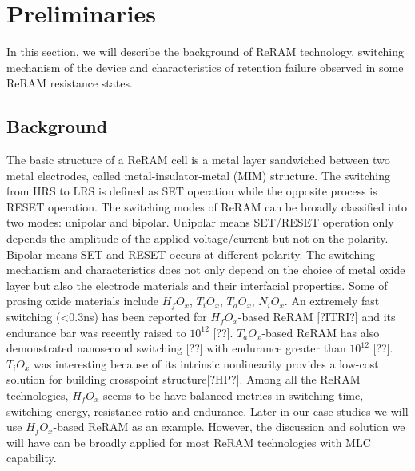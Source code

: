 \section{Preliminaries} \label{sec:preliminary}

In this section, we will describe the background of ReRAM technology, switching mechanism of the device and characteristics of retention failure observed in some ReRAM resistance states.

\subsection{Background}
The basic structure of a ReRAM cell is a metal layer sandwiched between two metal electrodes, called metal-insulator-metal (MIM) structure. The switching from HRS to LRS is defined as SET operation while the opposite process is RESET operation. The switching modes of ReRAM can be broadly classified into two modes: unipolar and bipolar. Unipolar means SET/RESET operation only depends the amplitude of the applied voltage/current but not on the polarity. Bipolar means SET and RESET occurs at different polarity. The switching mechanism and characteristics does not only depend on the choice of metal oxide layer but also the electrode materials and their interfacial properties. Some of prosing oxide materials include $H_fO_x$, $T_iO_x$, $T_aO_x$, $N_iO_x$. An extremely fast switching (<0.3ns) has been reported for $H_fO_x$-based ReRAM [?ITRI?] and its endurance bar was recently raised to $10^{12}$ [??]. $T_aO_x$-based ReRAM has also demonstrated nanosecond switching [??] with endurance greater than $10^{12}$ [??]. $T_iO_x$ was interesting because of its intrinsic nonlinearity provides a low-cost solution for building crosspoint structure[?HP?]. Among all the ReRAM technologies, $H_fO_x$ seems to be have balanced metrics in switching time, switching energy, resistance ratio and endurance. Later in our case studies we will use $H_fO_x$-based ReRAM as an example. However, the discussion and solution we will have can be broadly applied for most ReRAM technologies with MLC capability.

